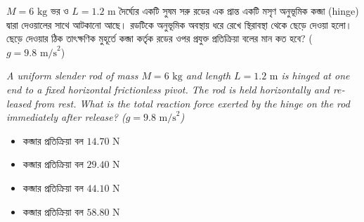 \documentclass[12pt, a4paper]{article}
\begin{document}
\begin{tcolorbox}[questionbox={প্রশ্ন (Question) 29}]
    \noindent
    $M = 6\text{ kg}$ ভর ও $L = 1.2\text{ m}$ দৈর্ঘ্যের একটি সুষম সরু রডের এক প্রান্ত একটি মসৃণ অনুভূমিক কব্জা (hinge) দ্বারা দেওয়ালের সাথে আটকানো আছে। রডটিকে অনুভূমিক অবস্থায় ধরে রেখে স্থিরাবস্থা থেকে ছেড়ে দেওয়া হলো। ছেড়ে দেওয়ার ঠিক তাৎক্ষণিক মুহূর্তে কব্জা কর্তৃক রডের ওপর প্রযুক্ত প্রতিক্রিয়া বলের মান কত হবে? ($g = 9.8\text{ m/s}^2$)
    
    \vspace{0.8em}
    \begin{english}
    \noindent\textit{\color{darkgray}
    A uniform slender rod of mass $M = 6\text{ kg}$ and length $L = 1.2\text{ m}$ is hinged at one end to a fixed horizontal frictionless pivot. The rod is held horizontally and released from rest. What is the total reaction force exerted by the hinge on the rod immediately after release? ($g = 9.8\text{ m/s}^2$)
    }
    \end{english}
\end{tcolorbox}

\vspace{1em}
\begin{center}
\end{center}
\vspace{1em}

\begin{itemize}[label={}, leftmargin=1cm, itemsep=0.5em]
    \item[\textbf{A)}] কব্জার প্রতিক্রিয়া বল $14.70\text{ N}$
    \item[\textbf{B)}] কব্জার প্রতিক্রিয়া বল $29.40\text{ N}$
    \item[\textbf{C)}] কব্জার প্রতিক্রিয়া বল $44.10\text{ N}$
    \item[\textbf{D)}] কব্জার প্রতিক্রিয়া বল $58.80\text{ N}$
\end{itemize}
\end{document}
